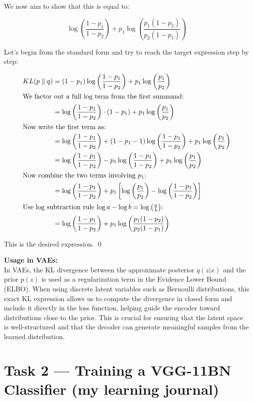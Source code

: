\documentclass[10pt]{article}
\begin{document}
We now aim to show that this is equal to:

\[
\log \left( \frac{1 - p_1}{1 - p_2} \right) + p_1 \log \left( \frac{p_1 (1 - p_2)}{p_2 (1 - p_1)} \right)
\]

Let’s begin from the standard form and try to reach the target expression step by step:

\begin{align*}
KL(p \parallel q)
&= (1 - p_1) \log \left( \frac{1 - p_1}{1 - p_2} \right) + p_1 \log \left( \frac{p_1}{p_2} \right) \\
\intertext{We factor out a full log term from the first summand:}
&= \log \left( \frac{1 - p_1}{1 - p_2} \right) \cdot (1 - p_1) + p_1 \log \left( \frac{p_1}{p_2} \right) \\
\intertext{Now write the first term as:}
&= \log \left( \frac{1 - p_1}{1 - p_2} \right) + (1 - p_1 - 1) \log \left( \frac{1 - p_1}{1 - p_2} \right) + p_1 \log \left( \frac{p_1}{p_2} \right) \\
&= \log \left( \frac{1 - p_1}{1 - p_2} \right) - p_1 \log \left( \frac{1 - p_1}{1 - p_2} \right) + p_1 \log \left( \frac{p_1}{p_2} \right) \\
\intertext{Now combine the two terms involving \( p_1 \):}
&= \log \left( \frac{1 - p_1}{1 - p_2} \right) + p_1 \left[ \log \left( \frac{p_1}{p_2} \right) - \log \left( \frac{1 - p_1}{1 - p_2} \right) \right] \\
\intertext{Use log subtraction rule \( \log a - \log b = \log \left( \frac{a}{b} \right) \):}
&= \log \left( \frac{1 - p_1}{1 - p_2} \right) + p_1 \log \left( \frac{p_1 (1 - p_2)}{p_2 (1 - p_1)} \right)
\end{align*}

\noindent This is the desired expression. \qed

\medskip

\noindent \textbf{Usage in VAEs:} \\
In VAEs, the KL divergence between the approximate posterior \( q(z|x) \) and the prior \( p(z) \) is used as a regularization term in the Evidence Lower Bound (ELBO). When using discrete latent variables such as Bernoulli distributions, this exact KL expression allows us to compute the divergence in closed form and include it directly in the loss function, helping guide the encoder toward distributions close to the prior.
This is crucial for ensuring that the latent space is well-structured and that the decoder can generate meaningful samples from the learned distribution.
\section*{Task 2 — Training a VGG-11BN Classifier (my learning journal)}
\end{document}
